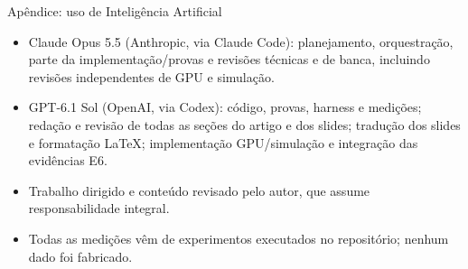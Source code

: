 \documentclass[aspectratio=169,12pt]{beamer}
\begin{document}
\begin{frame}{Apêndice: uso de Inteligência Artificial}
\small
\begin{itemize}
\item Claude Opus 5.5 (Anthropic, via Claude Code): planejamento,
orquestração, parte da implementação/provas e revisões técnicas e de banca, incluindo revisões independentes de GPU e simulação.
\item GPT-6.1 Sol (OpenAI, via Codex): código, provas, harness e medições;
redação e revisão de todas as seções do artigo e dos slides;
tradução dos slides e formatação LaTeX; implementação GPU/simulação e integração das evidências E6.
\item Trabalho dirigido e conteúdo revisado pelo autor, que assume
responsabilidade integral.
\item Todas as medições vêm de experimentos executados no repositório;
nenhum dado foi fabricado.
\end{itemize}
\end{frame}
\end{document}
